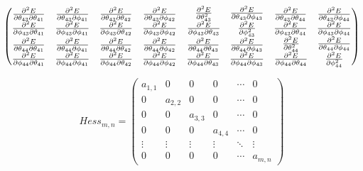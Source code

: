 \documentclass[9pt]{article}
\begin{document}
\begin{equation*}
\begin{pmatrix}
\begin{matrix}
			\pdv{E}{\theta_{43}}{\theta_{41}} & \pdv{E}{\theta_{43}}{\phi_{41}} \\
			\pdv{E}{\phi_{43}}{\theta_{41}} & \pdv{E}{\phi_{43}}{\phi_{41}} 
		\end{matrix} & 
		\begin{matrix} 
			\pdv{E}{\theta_{43}}{\theta_{42}} & \pdv{E}{\theta_{43}}{\phi_{42}} \\
			\pdv{E}{\phi_{43}}{\theta_{42}} & \pdv{E}{\phi_{43}}{\phi_{42}} 
		\end{matrix}&
		\begin{matrix} 
			\pdv[2]{E}{\theta_{43}} & \pdv{E}{\theta_{43}}{\phi_{43}} \\
			\pdv{E}{\phi_{43}}{\theta_{43}} & \pdv[2]{E}{\phi_{43}} 
		\end{matrix}&
		\begin{matrix} 
			\pdv{E}{\theta_{43}}{\theta_{44}} & \pdv{E}{\theta_{43}}{\phi_{44}} \\
			\pdv{E}{\phi_{43}}{\theta_{44}} & \pdv{E}{\phi_{43}}{\phi_{44}} 
		\end{matrix}\\
		\begin{matrix} 
			\pdv{E}{\theta_{44}}{\theta_{41}} & \pdv{E}{\theta_{44}}{\phi_{41}} \\
			\pdv{E}{\phi_{44}}{\theta_{41}} & \pdv{E}{\phi_{44}}{\phi_{41}} 
		\end{matrix} & 
		\begin{matrix} 
			\pdv{E}{\theta_{44}}{\theta_{42}} & \pdv{E}{\theta_{44}}{\phi_{42}} \\
			\pdv{E}{\phi_{44}}{\theta_{42}} & \pdv{E}{\phi_{44}}{\phi_{42}} 
		\end{matrix}&
		\begin{matrix} 
			\pdv{E}{\theta_{44}}{\theta_{43}} & \pdv{E}{\theta_{44}}{\phi_{43}} \\
			\pdv{E}{\phi_{44}}{\theta_{43}} & \pdv{E}{\phi_{44}}{\phi_{43}}
		\end{matrix}&
		\begin{matrix} 
			\pdv[2]{E}{\theta_{44}} & \pdv{E}{\theta_{44}}{\phi_{44}} \\
			\pdv{E}{\phi_{44}}{\theta_{44}} & \pdv[2]{E}{\phi_{44}} 
		\end{matrix}
	\end{pmatrix}
\end{equation*}

\begin{equation*}
	Hess_{m,n} = 
	\begin{pmatrix}
		a_{1,1} & 0 & 0 & 0 &\cdots & 0 \\
		0 & a_{2,2} & 0 & 0 &\cdots & 0 \\
		0 & 0 & a_{3,3} & 0 &\cdots & 0 \\
		0 & 0 & 0 & a_{4,4} &\cdots & 0 \\
		\vdots  & \vdots  & \vdots & \vdots & \ddots & \vdots\\
		0 & 0 & 0 & 0 & \cdots & a_{m,n} 
	\end{pmatrix}
\end{equation*}
\end{document}

